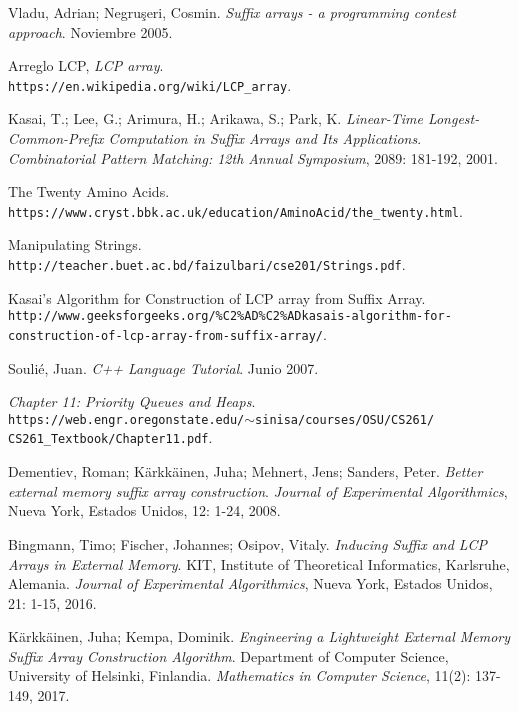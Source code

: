 \documentclass[letterpaper, 10pt, notitlepage]{report}
\begin{document}
\begin{thebibliography}{9}
Vladu, Adrian; Negru\c{s}eri, Cosmin.
\textit{Suffix arrays - a programming contest approach}. Noviembre 2005.

Arreglo LCP, \textit{LCP array}.
\\\texttt{https://en.wikipedia.org/wiki/LCP\_array}.

Kasai, T.; Lee, G.; Arimura, H.; Arikawa, S.; Park, K.
\textit{Linear-Time Longest-Common-Prefix Computation in Suffix Arrays and Its Applications}.
\textit{Combinatorial Pattern Matching: 12th Annual Symposium}, 2089: 181-192, 2001. 

The Twenty Amino Acids.
\\\texttt{https://www.cryst.bbk.ac.uk/education/AminoAcid/the\_twenty.html}.

Manipulating Strings.
\\\texttt{http://teacher.buet.ac.bd/faizulbari/cse201/Strings.pdf}.

Kasai’s Algorithm for Construction of LCP array from Suffix Array.
\\\texttt{http://www.geeksforgeeks.org/\%C2\%AD\%C2\%ADkasais-algorithm-for-}
\\\texttt{construction-of-lcp-array-from-suffix-array/}.

Soulié, Juan.
\textit{C++ Language Tutorial}. Junio 2007.

\textit{Chapter 11: Priority Queues and Heaps}.
\\\texttt{https://web.engr.oregonstate.edu/$\sim$sinisa/courses/OSU/CS261/}
\\\texttt{CS261\_Textbook/Chapter11.pdf}. 

Dementiev, Roman; Kärkkäinen, Juha; Mehnert, Jens; Sanders, Peter.
\textit{Better external memory suffix array construction}.
\textit{Journal of Experimental Algorithmics}, Nueva York, Estados Unidos, 12: 1-24, 2008.

Bingmann, Timo; Fischer, Johannes; Osipov, Vitaly.
\textit{Inducing Suffix and LCP Arrays in External Memory}.
KIT, Institute of Theoretical Informatics, Karlsruhe, Alemania.
\textit{Journal of Experimental Algorithmics}, Nueva York, Estados Unidos, 21: 1-15, 2016.

Kärkkäinen, Juha; Kempa, Dominik.
\textit{Engineering a Lightweight External Memory Suffix Array Construction Algorithm}.
Department of Computer Science, University of Helsinki, Finlandia.
\textit{Mathematics in Computer Science}, 11(2): 137-149, 2017.


\end{thebibliography}
\end{document}

